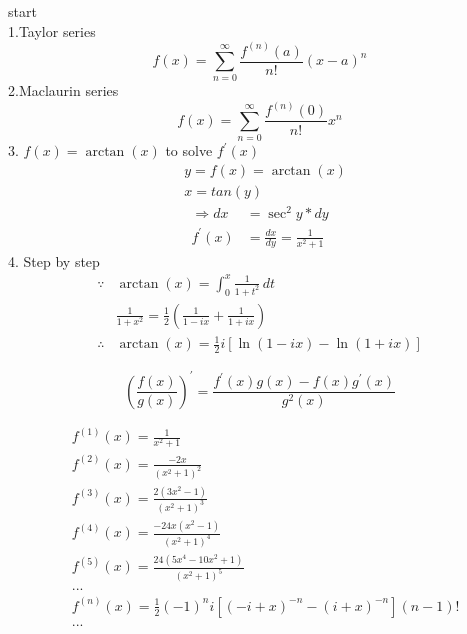 \documentclass[11pt,a4paper]{article}
\begin{document}
start\\
1.Taylor series 
   \begin{equation}\label{E1}
        f\left( x \right) = \sum\limits_{n = 0}^\infty  {\frac{{ { f^{\left( n \right)}}\left( a \right)}}{{n!}}} {\left( {x - a}\right)^n}
   \end{equation}
2.Maclaurin series
   \begin{equation}\label{E2}
        f\left( x \right) = \sum\limits_{n = 0}^\infty  {\frac{  f^{\left( n \right)}\left( 0 \right)  }{n!} } { x^n }
   \end{equation}
3. $f \left( x \right) = \arctan \left( x \right)$ to solve $ f^{ \prime }{ \left( x \right)}$ %
\begin{align*}
    &y = f \left( x \right) = \arctan \left( x \right) \\
    &x = tan \left( y \right) 
\end{align*}
\begin{align*}
    \Longrightarrow dx &= \sec^{2}y * dy \\
     f^{ \prime }{ \left( x \right) }&= { \frac {dx}{dy} }  = {\frac{1}{ x^{2}+1 } }
\end{align*}
4. Step by step 
\begin{align*}
    \because &\arctan \left( x \right) = \int \nolimits_0^x  \frac{1}{ 1+t^{2} } \,dt \\
             &\frac{1}{1+x^{2} } = \frac{1}{2}( \frac{1}{1-ix} + \frac{1}{1+ix} ) \\
    \therefore &\arctan \left( x \right) = \frac{1}{2}i \left[ \ln (1-ix) -\ln (1+ix) \right]
\end{align*}

   $$ \left( \frac { f \left( x \right) } { g \left( x \right)} \right)^{\prime} = \frac { { f^{  \prime } \left( x \right) } { g \left( x \right) } - { f \left( x \right) } { g^{  \prime  } \left( x \right) } }  {  g^{2} \left( x \right) } $$

\begin{align*}
       & f ^{\left( 1 \right)}\left( x \right) = {\frac{1}{ x^{2}+1 } }  \\
       & f ^{\left( 2 \right)}\left( x \right) = {\frac{-2x}{ \left(x^{2}+1\right)^{2} } }  \\
       & f ^{\left( 3 \right)}\left( x \right) = {\frac{2\left( 3x^{2}-1 \right) }{ \left(x^{2}+1\right)^{3} } } \\
       & f ^{\left( 4 \right)}\left( x \right) = {\frac{-24x\left(x^{2}-1\right) }{ \left(x^{2}+1\right)^{4} } }  \\
       & f ^{\left( 5 \right)}\left( x \right) = {\frac{24\left(5x^{4}-10x^{2}+1\right) }{ \left(x^{2}+1\right)^{5} } } \\
       & ...\\
       & f ^{\left( n \right)}\left( x \right) = \frac {1}{2} (-1)^{n} i \left[ (-i+x)^{-n}-(i+x)^{-n} \right] (n-1)! \\
       & ...\\    
\end{align*}
    
\end{document}
